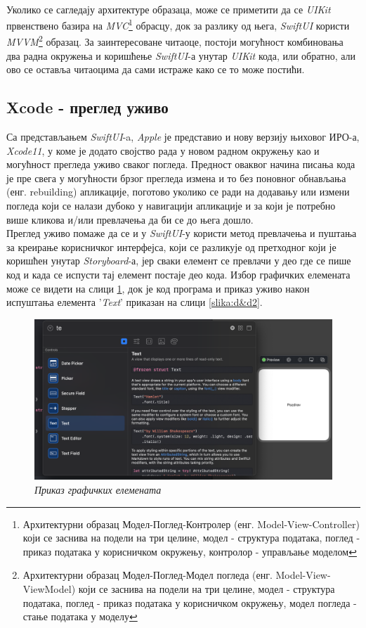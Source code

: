 \documentclass[12pt,oneside]{memoir}
\begin{document}
\\
\indent Уколико се сагледају архитектуре образаца, може се приметити да се \textit{UIKit} првенствено базира на \textit{MVC}\footnote{Архитектурни образац Модел-Поглед-Контролер (енг. Model-View-Controller) који се заснива на подели на три целине, модел - структура података, поглед - приказ података у корисничком окружењу, контролор - управљање моделом} обрасцу, док за разлику од њега, \textit{SwiftUI} користи \textit{MVVM}\footnote{Архитектурни образац Модел-Поглед-Модел погледа (енг. Model-View-ViewModel) који се заснива на подели на три целине, модел - структура података, поглед - приказ података у корисничком окружењу, модел погледа - стање података у моделу} образац. За заинтересоване читаоце, постоји могућност комбиновања два радна окружења и коришћење \textit{SwiftUI}-а унутар \textit{UIKit} кода, или обратно, али ово се оставља читаоцима да сами истраже како се то може постићи.

\subsection{Xcode - преглед уживо}
\label{subsec:Xcode - преглед уживо}

\indent Са представљањем \textit{SwiftUI}-a, \textit{Apple} је представио и нову верзију њиховог ИРО-а, \textit{Xcode11}, у коме је додато својство рада у новом радном окружењу као и могућност прегледа уживо сваког погледа. Предност оваквог начина писања кода је пре свега у могућности брзог прегледа измена и то без поновног обнављања (енг. rebuilding) апликације, поготово уколико се ради на додавању или измени погледа који се налази дубоко у навигацији апликације и за који је потребно више кликова и/или превлачења да би се до њега дошло. 
\\
\indent Преглед уживо помаже да се и у \textit{SwiftUI}-у користи метод превлачења и пуштања за креирање корисничког интерфејса, који се разликује од претходног који је коришћен унутар \textit{Storyboard}-а, јер сваки елемент се превлачи у део где се пише код и када се испусти тај елемент постаје део кода. Избор графичких елемената може се видети на слици \ref{slika:d&d1}, док је код програма и приказ уживо након испуштања елемента '\textit{Text}' приказан на слици \ref{slika:d&d2}.

\begin{figure}[H]
\includegraphics[width=1\textwidth]{images/Drag_and_drop_1.png}
\centering
\caption{\textit{Приказ графичких елемената}}
\label{slika:d&d1}
\end{figure}
\end{document}

